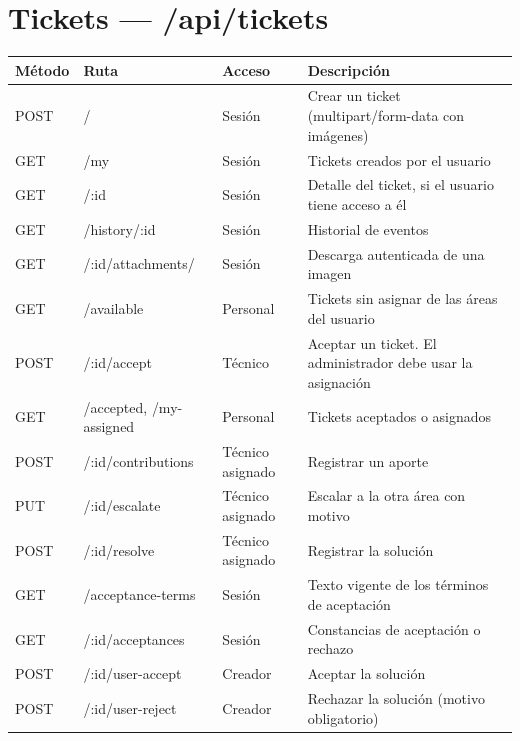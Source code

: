 \documentclass[11pt,a4paper,oneside]{report}
\newcommand{\codus}{\textunderscore\allowbreak}
\DeclareRobustCommand{\cod}[1]{{\small\ttfamily\let\_\codus #1}}
\newcommand{\cabecera}{\rowcolor{utaRojo!12}}
\begin{document}
\section{Tickets — \cod{/api/tickets}}
\begin{longtable}{@{}P{1.7cm}P{5.3cm}P{1.9cm}p{5.6cm}@{}}
\toprule
\cabecera \textbf{Método} & \textbf{Ruta} & \textbf{Acceso} & \textbf{Descripción} \\
\midrule
\endhead
POST & \cod{/} & Sesión & Crear un ticket (\cod{multipart/form-data} con imágenes) \\
GET & \cod{/my} & Sesión & Tickets creados por el usuario \\
GET & \cod{/:id} & Sesión & Detalle del ticket, si el usuario tiene acceso a él \\
GET & \cod{/history/:id} & Sesión & Historial de eventos \\
GET & \cod{/:id/attachments/}\allowbreak\cod{:attachmentId} & Sesión & Descarga autenticada de una imagen \\
GET & \cod{/available} & Personal & Tickets sin asignar de las áreas del usuario \\
POST & \cod{/:id/accept} & Técnico & Aceptar un ticket. El administrador debe usar la asignación \\
GET & \cod{/accepted}, \cod{/my-assigned} & Personal & Tickets aceptados o asignados \\
POST & \cod{/:id/contributions} & Técnico asignado & Registrar un aporte \\
PUT & \cod{/:id/escalate} & Técnico asignado & Escalar a la otra área con motivo \\
POST & \cod{/:id/resolve} & Técnico asignado & Registrar la solución \\
GET & \cod{/acceptance-terms} & Sesión & Texto vigente de los términos de aceptación \\
GET & \cod{/:id/acceptances} & Sesión & Constancias de aceptación o rechazo \\
POST & \cod{/:id/user-accept} & Creador & Aceptar la solución \\
POST & \cod{/:id/user-reject} & Creador & Rechazar la solución (motivo obligatorio) \\
\bottomrule
\end{longtable}
\end{document}
